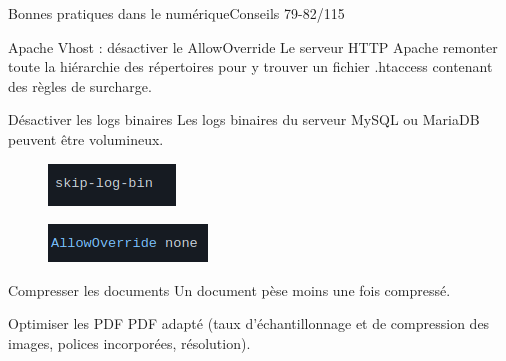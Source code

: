 \begin{frame}{Bonnes pratiques dans le numérique}{Conseils 79-82/115}
\begin{block}{Apache Vhost : désactiver le AllowOverride}
 Le serveur HTTP Apache remonter toute la hiérarchie des répertoires pour y trouver un fichier .htaccess contenant des règles de surcharge. 
\end{block}
\begin{block}{Désactiver les logs binaires}
 Les logs binaires du serveur MySQL ou MariaDB peuvent être volumineux.
\end{block}

\begin{minipage}[b]{0.5\linewidth}
\begin{figure}
    \includegraphics[scale=0.4]{chapitre2/wdd7/fig/c4.png}
    \centering
\end{figure}
\end{minipage}\hfill
\begin{minipage}[b]{0.5\linewidth}
\begin{figure}
    \includegraphics[scale=0.4]{chapitre2/wdd7/fig/c3.png}
    \centering
\end{figure}
\end{minipage}\hfill


\begin{block}{Compresser les documents}
Un document pèse moins une fois compressé.
\end{block}

\begin{block}{Optimiser les PDF}
PDF adapté (taux d’échantillonnage et de compression des images, polices incorporées, résolution).
\end{block}

\end{frame}


